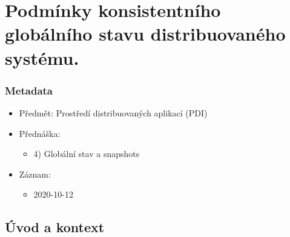 

\chapter{Podmínky konsistentního globálního stavu distribuovaného systému.}

\subsection*{Metadata}

\begin{itemize}
    \item Předmět: Prostředí distribuovaných aplikací (PDI)
    \item Přednáška:
    \begin{itemize}
        \item 4) Globální stav a snapshots
    \end{itemize}
    \item Záznam:
    \begin{itemize}
        \item 2020-10-12
    \end{itemize}
\end{itemize}


\section{Úvod a kontext}

